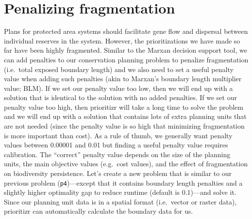 \documentclass[12pt,]{book}
\newenvironment{Shaded}{\begin{snugshade}}{\end{snugshade}}
\newcommand{\KeywordTok}[1]{\textcolor[rgb]{0.13,0.29,0.53}{\textbf{#1}}}
\newcommand{\DataTypeTok}[1]{\textcolor[rgb]{0.13,0.29,0.53}{#1}}
\newcommand{\DecValTok}[1]{\textcolor[rgb]{0.00,0.00,0.81}{#1}}
\newcommand{\FloatTok}[1]{\textcolor[rgb]{0.00,0.00,0.81}{#1}}
\newcommand{\StringTok}[1]{\textcolor[rgb]{0.31,0.60,0.02}{#1}}
\newcommand{\CommentTok}[1]{\textcolor[rgb]{0.56,0.35,0.01}{\textit{#1}}}
\newcommand{\OtherTok}[1]{\textcolor[rgb]{0.56,0.35,0.01}{#1}}
\newcommand{\OperatorTok}[1]{\textcolor[rgb]{0.81,0.36,0.00}{\textbf{#1}}}
\newcommand{\NormalTok}[1]{#1}
\begin{document}
\section{Penalizing fragmentation}\label{penalizing-fragmentation}

Plans for protected area systems should facilitate gene flow and
dispersal between individual reserves in the system. However, the
prioritizations we have made so far have been highly fragmented. Similar
to the Marxan decision support tool, we can add penalties to our
conservation planning problem to penalize fragmentation (i.e.~total
exposed boundary length) and we also need to set a useful penalty value
when adding such penalties (akin to Marxan's boundary length multiplier
value; BLM). If we set our penalty value too low, then we will end up
with a solution that is identical to the solution with no added
penalties. If we set our penalty value too high, then prioritizr will
take a long time to solve the problem and we will end up with a solution
that contains lots of extra planning units that are not needed (since
the penalty value is so high that minimizing fragmentation is more
important than cost). As a rule of thumb, we generally want penalty
values between 0.00001 and 0.01 but finding a useful penalty value
requires calibration. The ``correct'' penalty value depends on the size
of the planning units, the main objective values (e.g.~cost values), and
the effect of fragmentation on biodiversity persistence. Let's create a
new problem that is similar to our previous problem
(\texttt{p4})---except that it contains boundary length penalties and a
slightly higher optimality gap to reduce runtime (default is 0.1)---and
solve it. Since our planning unit data is in a spatial format
(i.e.~vector or raster data), prioritizr can automatically calculate the
boundary data for us.

\clearpage

\begin{Shaded}
\end{Shaded}
\end{document}
